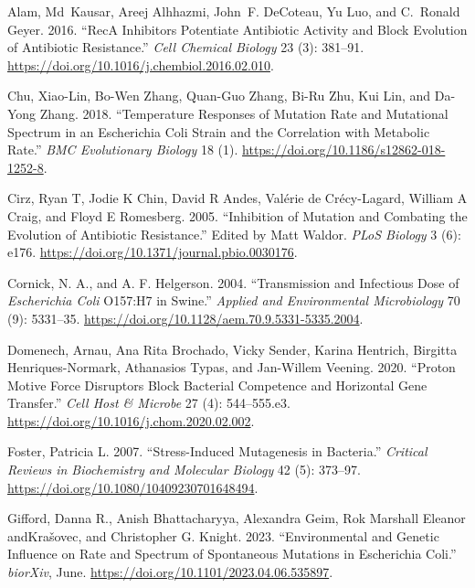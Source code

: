 \documentclass[
  12pt,
  letterpaper,
  DIV=11,
  numbers=noendperiod]{scrreprt}
\newlength{\cslhangindent}
\newlength{\cslentryspacingunit} %
\newenvironment{CSLReferences}[2] %
 {%
  \setlength{\parindent}{0pt}
  \ifodd #1
  \let\oldpar\par
  \def\par{\hangindent=\cslhangindent\oldpar}
  \fi
  \setlength{\parskip}{#2\cslentryspacingunit}
 }%
 {}
\begin{document}
\hypertarget{refs}{}
\begin{CSLReferences}{1}{0}
\leavevmode{}%
Alam, Md~Kausar, Areej Alhhazmi, John~F. DeCoteau, Yu Luo, and C.~Ronald
Geyer. 2016. {``RecA Inhibitors Potentiate Antibiotic Activity and Block
Evolution of Antibiotic Resistance.''} \emph{Cell Chemical Biology} 23
(3): 381--91. \url{https://doi.org/10.1016/j.chembiol.2016.02.010}.

\leavevmode{}%
Chu, Xiao-Lin, Bo-Wen Zhang, Quan-Guo Zhang, Bi-Ru Zhu, Kui Lin, and
Da-Yong Zhang. 2018. {``Temperature Responses of Mutation Rate and
Mutational Spectrum in an Escherichia Coli Strain and the Correlation
with Metabolic Rate.''} \emph{BMC Evolutionary Biology} 18 (1).
\url{https://doi.org/10.1186/s12862-018-1252-8}.

\leavevmode{}%
Cirz, Ryan T, Jodie K Chin, David R Andes, Valérie de Crécy-Lagard,
William A Craig, and Floyd E Romesberg. 2005. {``Inhibition of Mutation
and Combating the Evolution of Antibiotic Resistance.''} Edited by Matt
Waldor. \emph{PLoS Biology} 3 (6): e176.
\url{https://doi.org/10.1371/journal.pbio.0030176}.

\leavevmode{}%
Cornick, N. A., and A. F. Helgerson. 2004. {``Transmission and
Infectious Dose of {\emph{Escherichia Coli}} O157:H7 in Swine.''}
\emph{Applied and Environmental Microbiology} 70 (9): 5331--35.
\url{https://doi.org/10.1128/aem.70.9.5331-5335.2004}.

\leavevmode{}%
Domenech, Arnau, Ana Rita Brochado, Vicky Sender, Karina Hentrich,
Birgitta Henriques-Normark, Athanasios Typas, and Jan-Willem Veening.
2020. {``Proton Motive Force Disruptors Block Bacterial Competence and
Horizontal Gene Transfer.''} \emph{Cell Host \& Microbe} 27 (4):
544--555.e3. \url{https://doi.org/10.1016/j.chom.2020.02.002}.

\leavevmode{}%
Foster, Patricia L. 2007. {``Stress-Induced Mutagenesis in Bacteria.''}
\emph{Critical Reviews in Biochemistry and Molecular Biology} 42 (5):
373--97. \url{https://doi.org/10.1080/10409230701648494}.

\leavevmode{}%
Gifford, Danna R., Anish Bhattacharyya, Alexandra Geim, Rok Marshall
Eleanor andKrašovec, and Christopher G. Knight. 2023. {``Environmental
and Genetic Influence on Rate and Spectrum of Spontaneous Mutations in
Escherichia Coli.''} \emph{biorXiv}, June.
\url{https://doi.org/10.1101/2023.04.06.535897}.


\end{CSLReferences}
\end{document}
